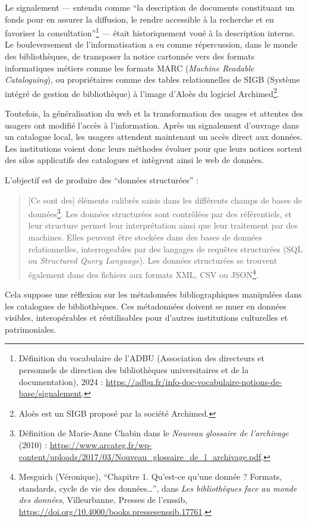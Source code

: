 Le signalement — entendu comme \enquote{la description de documents constituant un fonds pour en assurer la diffusion, le rendre accessible à la recherche et en favoriser la consultation}\footnote{Définition du vocabulaire de l'ADBU (Association des directeurs et personnels de direction des bibliothèques universitaires et de la documentation), 2024 : \url{https://adbu.fr/info-doc-vocabulaire-notions-de-base/signalement}.} — était historiquement voué à la description interne. Le bouleversement de l'informatisation a eu comme répercussion, dans le monde des bibliothèques, de transposer la notice cartonnée vers des formats informatiques métiers comme les formats MARC (\textit{Machine Readable Cataloguing}), ou propriétaires comme des tables relationnelles de SIGB (Système intégré de gestion de bibliothèque) à l'image d'Aloès du logiciel Archimed\footnote{Aloès est un SIGB proposé par la société Archimed.}.

Toutefois, la généralisation du web et la transformation des usages et attentes des usagers ont modifié l'accès à l'information. Après un signalement d'ouvrage dans un catalogue local, les usagers attendent maintenant un accès direct aux données. Les institutions voient donc leurs méthodes évoluer pour que leurs notices sortent des silos applicatifs des catalogues et intègrent ainsi le web de données.

L'objectif est de produire des \enquote{données structurées} :
\begin{quotation}
	[Ce sont des] éléments calibrés saisis dans les différents champs de bases de données\footnote{Définition de Marie-Anne Chabin dans le \textit{Nouveau glossaire de l'archivage} (2010) : \url{https://www.arcateg.fr/wp-content/uploads/2017/03/Nouveau_glossaire_de_l_archivage.pdf}.}. Les données structurées sont contrôlées par des référentiels, et leur structure permet leur interprétation ainsi que leur traitement par des machines. Elles peuvent être stockées dans des bases de données relationnelles, interrogeables par des langages de requêtes structurées (SQL ou \textit{Structured Query Language}). Les données structurées se trouvent également dans des fichiers aux formats XML, CSV ou JSON\footnote{Mesguich (Véronique), \enquote{Chapitre 1. Qu’est-ce qu’une donnée ? Formats, standards, cycle de vie des données…}, dans \textit{Les bibliothèques face au monde des données}, Villeurbanne, Presses de l’enssib, \url{https://doi.org/10.4000/books.pressesenssib.17761}.}.
\end{quotation}

Cela suppose une réflexion sur les métadonnées bibliographiques manipulées dans les catalogues de bibliothèques. Ces métadonnées doivent se muer en données visibles, interopérables et réutilisables pour d'autres institutions culturelles et patrimoniales.

